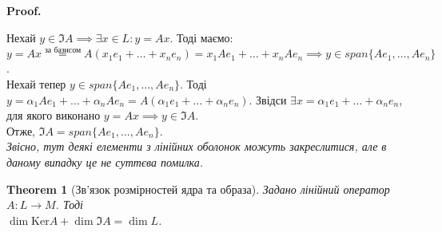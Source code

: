 \documentclass[a4paper, 10pt]{article}
\makeatletter
\def\qed{$\blacksquare$}
\def\ker#1{\textrm{Ker} {#1}}
\theoremstyle{theoremdd}
\newtheorem{theorem}{Theorem}[subsection]
\theoremstyle{theoremdd}
\theoremstyle{theoremdd}
\theoremstyle{theoremdd}
\theoremstyle{theoremdd}
\theoremstyle{theoremdd}
\theoremstyle{theoremdd}
\theoremstyle{theoremdd}
\renewenvironment{proof}[1][Proof.\\]{\par
\pushQED{\hfill \qed}%
\normalfont \topsep6\p@\@plus6\p@\relax
\trivlist
\item\relax
{\bfseries
#1\@addpunct{.}}\hspace\labelsep\ignorespaces
}{%
\popQED\endtrivlist\@endpefalse
}
\makeatother
\begin{document}
	\begin{proof}
	Нехай $y \in \Im A \implies \exists x \in L: y = Ax$. Тоді маємо:\\
	$y = Ax \overset{\textrm{за базисом}}{=} A(x_1e_1 + \dots + x_n e_n) = x_1 Ae_1 + \dots + x_n A e_n \implies y \in span\{Ae_1,\dots,Ae_n\}$.\\
	Нехай тепер $y \in span\{Ae_1,\dots,Ae_n\}$. Тоді $y = \alpha_1 Ae_1 + \dots + \alpha_n Ae_n = A(\alpha_1 e_1 + \dots + \alpha_n e_n)$. Звідси $\exists x = \alpha_1 e_1 + \dots + \alpha_n e_n$, для якого виконано $y = Ax \implies y \in \Im A$.\\
	Отже, $\Im A = span \{Ae_1, \dots, Ae_n \}$.\\
	\textit{Звісно, тут деякі елементи з лінійних оболонок можуть закреслитися, але в даному випадку це не суттєва помилка.}
	\end{proof}
	
	\begin{theorem}[Зв'язок розмірностей ядра та образа]
	Задано лінійний оператор $A: L \to M$. Тоді\\
	$\dim \ker A + \dim \Im A = \dim L$.
	\end{theorem}
	
\end{document}
